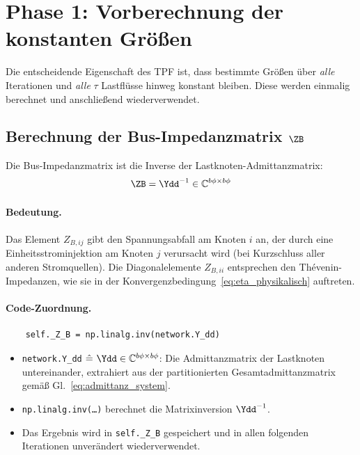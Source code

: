 \section{Phase 1: Vorberechnung der konstanten Größen}
\label{sec:vorberechnung}

Die entscheidende Eigenschaft des TPF ist, dass bestimmte Größen über \textit{alle} Iterationen und \textit{alle} $\tau$ Lastflüsse hinweg konstant bleiben. Diese werden einmalig berechnet und anschließend wiederverwendet.

\subsection{Berechnung der Bus-Impedanzmatrix $\ZB$}
\label{subsec:zb_berechnung}

Die Bus-Impedanzmatrix ist die Inverse der Lastknoten-Admittanzmatrix:
\begin{equation}
	\ZB = \Ydd^{-1} \in \mathbb{C}^{b\phi \times b\phi}
	\label{eq:zb_def}
\end{equation}

\paragraph{Bedeutung.} Das Element $Z_{B,ij}$ gibt den Spannungsabfall am Knoten $i$ an, der durch eine Einheitsstrominjektion am Knoten $j$ verursacht wird (bei Kurzschluss aller anderen Stromquellen). Die Diagonalelemente $Z_{B,ii}$ entsprechen den Thévenin-Impedanzen, wie sie in der Konvergenzbedingung~\eqref{eq:eta_physikalisch} auftreten.

\paragraph{Code-Zuordnung.}
\begin{verbatim}
	self._Z_B = np.linalg.inv(network.Y_dd)
\end{verbatim}

\begin{itemize}
	\item \texttt{network.Y\_dd} $\hat{=}\ \Ydd \in \mathbb{C}^{b\phi \times b\phi}$: Die Admittanzmatrix der Lastknoten untereinander, extrahiert aus der partitionierten Gesamtadmittanzmatrix gemäß Gl.~\eqref{eq:admittanz_system}.
	\item \texttt{np.linalg.inv(\ldots)} berechnet die Matrixinversion $\Ydd^{-1}$.
	\item Das Ergebnis wird in \texttt{self.\_Z\_B} gespeichert und in allen folgenden Iterationen unverändert wiederverwendet.
\end{itemize}

